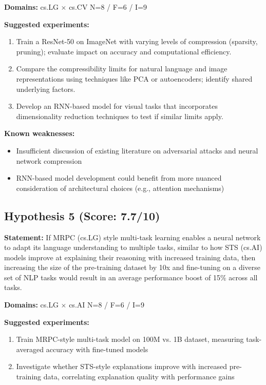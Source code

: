 \documentclass[12pt,a4paper]{article}
\begin{document}
\noindent\textbf{Domains:} cs.LG $\times$ cs.CV
\hspace{1em} N=8 / F=6 / I=9

\textbf{Suggested experiments:}
\begin{enumerate}
  \item Train a ResNet-50 on ImageNet with varying levels of compression (sparsity, pruning); evaluate impact on accuracy and computational efficiency.
  \item Compare the compressibility limits for natural language and image representations using techniques like PCA or autoencoders; identify shared underlying factors.
  \item Develop an RNN-based model for visual tasks that incorporates dimensionality reduction techniques to test if similar limits apply.
\end{enumerate}

\textbf{Known weaknesses:}
\begin{itemize}
  \item Insufficient discussion of existing literature on adversarial attacks and neural network compression
  \item RNN-based model development could benefit from more nuanced consideration of architectural choices (e.g., attention mechanisms)
\end{itemize}
\subsection*{Hypothesis 5 (Score: 7.7/10)}

\textbf{Statement:} If MRPC (cs.LG) style multi-task learning enables a neural network to adapt its language understanding to multiple tasks, similar to how STS (cs.AI) models improve at explaining their reasoning with increased training data, then increasing the size of the pre-training dataset by 10x and fine-tuning on a diverse set of NLP tasks would result in an average performance boost of 15\% across all tasks.

\noindent\textbf{Domains:} cs.LG $\times$ cs.AI
\hspace{1em} N=8 / F=6 / I=9

\textbf{Suggested experiments:}
\begin{enumerate}
  \item Train MRPC-style multi-task model on 100M vs. 1B dataset, measuring task-averaged accuracy with fine-tuned models
  \item Investigate whether STS-style explanations improve with increased pre-training data, correlating explanation quality with performance gains
\end{enumerate}
\end{document}
